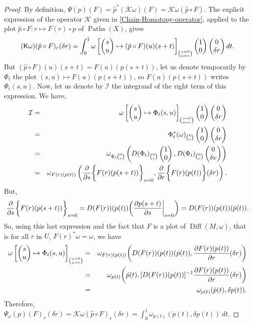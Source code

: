 \documentclass[10pt,reqno,twoside]{amsart}
\newcommand{\mymatrix}[1]{\begin{pmatrix} #1 \end{pmatrix}}
\newcommand{\cI}{\mathcal{I}}
\newcommand{\cK}{\mathcal{K}}
\DeclareMathOperator{\Diff}{Diff}
\DeclareMathOperator{\Paths}{Paths}
\newcommand{\eK}{\mathbf{\sf K}}
\newcommand{\D}{D}
\theoremstyle{plain}
\theoremstyle{definition}
\begin{document}
  \begin{proof}
    By definition,
    $\Psi(p)(F) = \hat p^*(\cK \omega)(F) = \cK \omega (\hat p \circ F)$.
    The explicit expression of the operator $\cK$ given in \ref{Chain-Homotopy-operator},
    applied to the plot $\hat p \circ F : r \mapsto F(r) \circ p$ of $\Paths(X)$,
    gives
    $$
      (\eK\omega)(\hat p \circ F)_r(\delta r) = \int_0^1 \omega \left[ \mymatrix{s \cr u} \mapsto (\hat p \circ F)(u)(s + t) \right]_{s=0 \choose u=r}\mymatrix{1 \cr 0} \mymatrix{0 \cr \delta r} dt.
      $$
    But $(\hat p \circ F)(u)(s + t) = F(u)(p(s+t))$,
    let us denote temporarily by $\Phi_t$ the plot $(s,u) \mapsto F(u)(p(s+t))$,
    so $F(u)(p(s+t))$ writes $\Phi_t(s,u)$.
    Now,
    let us denote by $\cI$ the integrand of the right term of this expression.
    We have,
    \begin{eqnarray*}
      \cI & = & \omega \left[ \mymatrix{s \cr u} \mapsto \Phi_t(s,u) \right]_{s=0 \choose u=r}\mymatrix{1 \cr 0} \mymatrix{0 \cr \delta r}\\
      & = & \Phi_t^*(\omega)_{0 \choose r} \mymatrix{1 \cr 0} \mymatrix{0 \cr \delta r} \\
      & = & \omega_{\Phi_t{{0 \choose r}}} \left(\D(\Phi_t)_{0 \choose r} \mymatrix{1 \cr 0},\D(\Phi_t)_{0 \choose r} \mymatrix{0 \cr \delta v}\right) \\
      & =& \omega_{F(r)(p(t))} \left({\partial \over \partial s} \bigg\{ F(r)(p(s+t))\bigg\}_{s=0}, {\partial \over \partial r} \bigg\{F(r)(p(t)) \bigg\} (\delta r)\right).
    \end{eqnarray*}
    But,
    $$
      {\partial \over \partial s} \bigg\{ F(r)(p(s+t))\bigg\}_{s=0} = \D(F(r))(p(t))\bigg({\partial p(s+t) \over \partial s}\bigg|_{s=0}\bigg) = \D(F(r))(p(t))(\dot p(t)).
      $$
    So,
    using this last expression and the fact that $F$ is a plot of $\Diff(M,\omega)$,
    that is for all $r$ in $U$,
    $F(r)^*\omega = \omega$,
    we have
    \begin{eqnarray*}
      \omega \left[\mymatrix{s \cr u} \mapsto \Phi_t(s,u)\right]_{s=0 \choose u=r} & = & \omega_{F(r)(p(t))} \bigg(\D(F(r))(p(t))(\dot p(t)) , {\partial F(r)(p(t)) \over \partial r} (\delta r)\bigg) \\
      &=& \omega_{p(t)} \bigg(\dot p(t) , [\D(F(r))(p(t))]^{-1}{\partial F(r)(p(t)) \over \partial r} (\delta r)\bigg) \\
      &=& \omega_{p(t)} (\dot p(t) , \delta p(t)).
    \end{eqnarray*}
    Therefore,
    $\Psi_\omega(p)(F)_r(\delta r) = \cK \omega (\hat p \circ F)_r(\delta r) = \displaystyle{\int_0^1} \omega_{p(t)}(\dot p(t), \delta p(t)) \ dt$.
  \end{proof}
  
\end{document}
